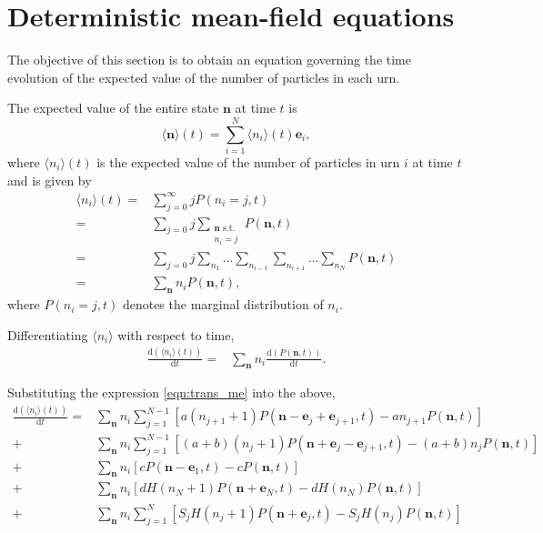 \documentclass[a4paper,11pt]{article}
\numberwithin{equation}{section}
\newcommand{\diff}[2]{\frac{\mathrm{d} #1}{\mathrm{d} #2}}
\newcommand{\V}[1]{\mathbf{#1}}
\newcommand{\E}[1]{\langle #1 \rangle}
\begin{document}
\section{Deterministic mean-field equations}
The objective of this section is to obtain an equation governing the time
evolution of the expected value of the number of particles in each urn.

The expected value of the entire state \(\V{n}\) at time \(t\) is
\begin{equation*}
    \E{\V{n}}(t) = \sum_{i=1}^N \langle n_i \rangle(t) \V{e}_i,
\end{equation*}
where \(\E{n_i}(t)\) is the expected value of the number of particles in urn
\(i\) at time \(t\) and is given by
\begin{align*}
    \E{n_i}(t) =& \sum_{j=0}^\infty j P(n_i = j,t)\\
    =& \sum_{j=0} j
    \sum_{\substack{\V{n} \text{ s.t.} \\ n_i=j}} P(\V{n},t)\\
    =& \sum_{j=0} j
    \sum_{n_1} \dotso \sum_{n_{i-1}} \sum_{n_{i+1}} \dotso \sum_{n_N} P(\V{n},t)\\
    =& \sum_{\V{n}} n_i P(\V{n},t),
\end{align*}
where \(P(n_i = j,t)\) denotes the marginal distribution of \(n_i\).

Differentiating \(\E{n_i}\) with respect to time,
\begin{align*}
    \diff{(\E{n_i}(t))}{t} =& \sum_{\V{n}} n_i \diff{(P(\V{n},t))}{t}.
\end{align*}

Substituting the expression \eqref{eqn:trans_me} into the above,
\begin{subequations}
\begin{align}
    \label{eqn:trans_expectation_hl_term}
    \diff{(\E{n_i}(t))}{t}
    = & \sum_\V{n} n_i \sum_{j=1}^{N-1}
    \left[a(n_{j+1}+1) P(\V{n} - \V{e}_j + \V{e}_{j+1},t) -
        an_{j+1} P(\V{n},t)\right] \\
    \label{eqn:trans_expectation_hr_term}
    + & \sum_\V{n} n_i \sum_{j=1}^{N-1}
    \left[(a+b)(n_j+1) P(\V{n} + \V{e}_j - \V{e}_{j+1},t) -
        (a+b)n_j P(\V{n},t)\right] \\
    \label{eqn:trans_expectation_in_term}
    + & \sum_\V{n} n_i
    \left[c P(\V{n} - \V{e}_1,t) - c P(\V{n},t)\right] \\
    \label{eqn:trans_expectation_out_term}
    + & \sum_\V{n} n_i
    \left[d H(n_N+1) P(\V{n} + \V{e}_N,t) - d H(n_N) P(\V{n},t)\right] \\
    \label{eqn:trans_expectation_rem_term}
    + & \sum_\V{n} n_i \sum_{j=1}^{N}
    \left[S_j H(n_j + 1) P(\V{n} + \V{e}_j,t) - S_j H(n_j) P(\V{n},t)\right]
\end{align}
\end{subequations}
\end{document}
